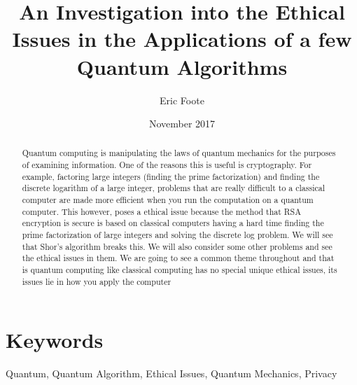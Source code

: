 \documentclass{article}
\title{An Investigation into the Ethical Issues in the Applications of a few Quantum Algorithms}
\author{Eric Foote}
\date{November 2017}
\begin{document}
\maketitle

\begin{abstract}
Quantum computing is manipulating the laws of quantum mechanics for the purposes of examining information.  One of the reasons this is useful is cryptography. For example, factoring large integers (finding the prime factorization) and finding
the discrete logarithm of a large integer, problems that are really difficult to a classical computer are made more efficient when you run the computation on a quantum computer. This however, poses a ethical issue because the method that RSA  encryption is secure is based on classical computers having a hard time finding the prime factorization of large integers and solving the discrete log problem. We will see that Shor's algorithm breaks this. We will also consider some other problems and see the ethical issues in them. We are going to see a common theme throughout and that is quantum computing like classical computing has no special unique ethical issues, its issues lie in how you apply the computer
\end{abstract}
\section{Keywords}
Quantum, Quantum Algorithm, Ethical Issues, Quantum Mechanics, Privacy
\end{document}
